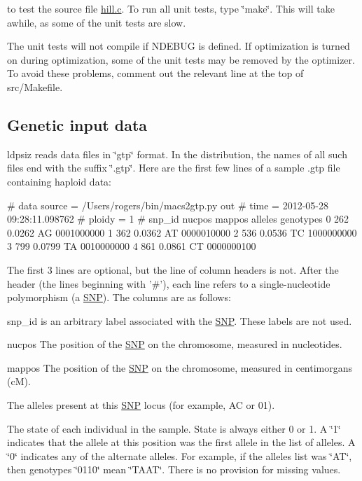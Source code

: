 to test the source file {\ttfamily \hyperlink{hill_8c}{hill.\-c}}. To run all unit tests, type \char`\"{}make\char`\"{}. This will take awhile, as some of the unit tests are slow.

The unit tests will not compile if {\ttfamily N\-D\-E\-B\-U\-G} is defined. If optimization is turned on during optimization, some of the unit tests may be removed by the optimizer. To avoid these problems, comment out the relevant line at the top of src/\-Makefile.

\subsection*{Genetic input data}

{\ttfamily ldpsiz} reads data files in \char`\"{}gtp\char`\"{} format. In the distribution, the names of all such files end with the suffix \char`\"{}.\-gtp\char`\"{}. Here are the first few lines of a sample .gtp file containing haploid data\-: \begin{DoxyVerb}# data source           = /Users/rogers/bin/macs2gtp.py out
# time                  = 2012-05-28 09:28:11.098762
# ploidy                = 1
#   snp_id     nucpos   mappos alleles genotypes
         0        262   0.0262      AG 0001000000
         1        362   0.0362      AT 0000010000
         2        536   0.0536      TC 1000000000
         3        799   0.0799      TA 0010000000
         4        861   0.0861      CT 0000000100
\end{DoxyVerb}


The first 3 lines are optional, but the line of column headers is not. After the header (the lines beginning with '\#'), each line refers to a single-\/nucleotide polymorphism (a \hyperlink{struct_s_n_p}{S\-N\-P}). The columns are as follows\-:


\begin{DoxyEnumerate}
\item snp\-\_\-id is an arbitrary label associated with the \hyperlink{struct_s_n_p}{S\-N\-P}. These labels are not used.
\item nucpos The position of the \hyperlink{struct_s_n_p}{S\-N\-P} on the chromosome, measured in nucleotides.
\item mappos The position of the \hyperlink{struct_s_n_p}{S\-N\-P} on the chromosome, measured in centimorgans (c\-M).
\item The alleles present at this \hyperlink{struct_s_n_p}{S\-N\-P} locus (for example, A\-C or 01).
\item The state of each individual in the sample. State is always either 0 or 1. A \char`\"{}1\char`\"{} indicates that the allele at this position was the first allele in the list of alleles. A \char`\"{}0\char`\"{} indicates any of the alternate alleles. For example, if the alleles list was \char`\"{}\-A\-T\char`\"{}, then genotypes \char`\"{}0110\char`\"{} mean \char`\"{}\-T\-A\-A\-T\char`\"{}. There is no provision for missing values.
\end{DoxyEnumerate}

